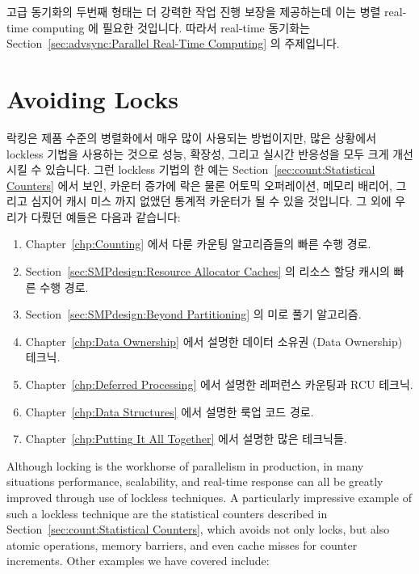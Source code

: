 고급 동기화의 두번째 형태는 더 강력한 작업 진행 보장을 제공하는데 이는 병렬
real-time computing 에 필요한 것입니다.
따라서 real-time 동기화는
Section~\ref{sec:advsync:Parallel Real-Time Computing} 의 주제입니다.
\iffalse

The second form of advanced synchronization provides stronger forward-progress
guarantees, as needed for parallel real-time computing.
Real-time synchronization is therfore the topic of
Section~\ref{sec:advsync:Parallel Real-Time Computing}.
\fi

\section{Avoiding Locks}
\label{sec:advsync:Avoiding Locks}

락킹은 제품 수준의 병렬화에서 매우 많이 사용되는 방법이지만, 많은 상황에서
lockless 기법을 사용하는 것으로 성능, 확장성, 그리고 실시간 반응성을 모두 크게
개선시킬 수 있습니다.
그런 lockless 기법의 한 예는 Section~\ref{sec:count:Statistical Counters} 에서
보인, 카운터 증가에 락은 물론 어토믹 오퍼레이션, 메모리 배리어, 그리고 심지어
캐시 미스 까지 없앴던 통계적 카운터가 될 수 있을 것입니다.
그 외에 우리가 다뤘던 예들은 다음과 같습니다:

\begin{enumerate}
\item	Chapter~\ref{chp:Counting} 에서 다룬 카운팅 알고리즘들의 빠른 수행
	경로.
\item	Section~\ref{sec:SMPdesign:Resource Allocator Caches} 의 리소스 할당
	캐시의 빠른 수행 경로.
\item	Section~\ref{sec:SMPdesign:Beyond Partitioning} 의 미로 풀기 알고리즘.
\item	Chapter~\ref{chp:Data Ownership} 에서 설명한 데이터 소유권 (Data
	Ownership) 테크닉.
\item	Chapter~\ref{chp:Deferred Processing} 에서 설명한 레퍼런스 카운팅과 RCU
	테크닉.
\item	Chapter~\ref{chp:Data Structures} 에서 설명한 룩업 코드 경로.
\item	Chapter~\ref{chp:Putting It All Together} 에서 설명한 많은 테크닉들.
\end{enumerate}
\iffalse

Although locking is the workhorse of parallelism in production, in
many situations performance, scalability, and real-time response can
all be greatly improved through use of lockless techniques.
A particularly impressive example of such a lockless technique are
the statistical counters described in
Section~\ref{sec:count:Statistical Counters},
which avoids not only locks, but also atomic operations, memory barriers,
and even cache misses for counter increments.
Other examples we have covered include:

